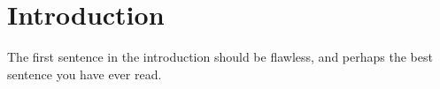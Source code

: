 \chapter{Introduction}\label{ch:introduction}

The first sentence in the introduction should be flawless, and perhaps the best sentence you have ever read.


